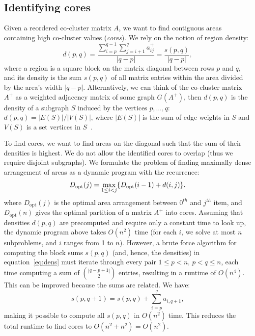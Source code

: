 \documentclass[12pt]{cmuthesis}
\begin{document}
  \subsection{Identifying cores}
  \label{sec:dense_sub}

  Given a reordered co-cluster matrix $A$, we want to find contiguous areas containing high co-cluster values (\textit{cores}). We rely on the notion of region density:
  \begin{equation}\label{eq:dens}
    d(p, q) = \frac{ \sum_{i=p}^{q-1} \sum_{j=i+1}^{q} a^{+}_{ij}}{ |q-p|} =
    \frac{s(p,q)}{ |q-p|},
  \end{equation}
  where a region is a square block on the matrix diagonal between rows $p$ and $q$, and its density is the sum $s(p, q)$ of all matrix entries within the area divided by the area's width $|q-p|$. Alternatively, we can think of the co-cluster matrix $A^{+}$ as a weighted adjacency matrix of some graph $G(A^{+})$, then $d(p,q)$ is the density of a subgraph $S$ induced by the vertices $p, \ldots, q$: $d(p,q) = |E(S)| / |V(S)|$, where $|E(S)|$ is the sum of edge weights in $S$ and $V(S)$ is a set vertices in $S$~\cite{Saha}.

  To find cores, we want to find areas on the diagonal such that the sum of their densities is highest. We do not allow the identified cores to overlap (thus we require disjoint subgraphs). We formulate the problem of finding maximally dense arrangement of areas as a dynamic program with the recurrence:
  \[
    D_{\textrm{\scriptsize opt}}(j) = \max_{1 \leq i < j}
            \{D_{\textrm{\scriptsize opt}}(i - 1) + d(i,j)\}.
  \]
  where $D_{\textrm{opt}}(j)$ is the optimal area arrangement between $0^{th}$ and $j^{th}$ item, and $D_{\textrm{opt}}(n)$ gives the optimal partition of a matrix $A^{+}$ into cores. Assuming that densities $d(p, q)$ are precomputed and require only a constant time to look up, the dynamic program above takes $O(n^2)$ time (for each $i$, we solve at most $n$ subproblems, and $i$ ranges from 1 to $n$). However, a brute force algorithm for computing the block sums $s(p,q)$ (and, hence, the densities) in equation~\ref{eq:dens} must iterate through every pair $1 \leq p < n$, $p < q \leq n$, each time computing a sum of ${|q-p+1| \choose 2}$ entries, resulting in  a runtime of $O(n^4)$. This can be improved because the sums are related. We have:
  \[
   s(p, q+1) = s(p, q) + \sum_{i = p}^{q} a_{i, q+1},
   \]
  making it possible to compute all $s(p,q)$ in $O(n^{2})$ time. This reduces the total runtime to find cores to $O(n^2 + n^2) = O(n^2)$.
\end{document}
